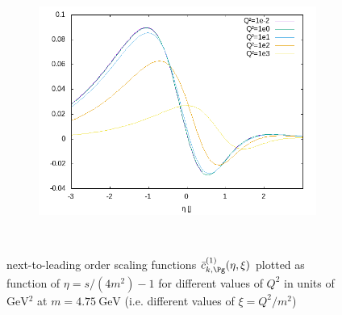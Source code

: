 \begin{figure}[ht!]
\begin{subfigure}[t]{.3\textwidth}
\end{subfigure}%
\begin{subfigure}[t]{.3\textwidth}
	\includegraphics[width=\textwidth]{../../img2/partonic/cgBar1_AA_x2g1}
\end{subfigure}\\%
\caption{next-to-leading order scaling functions $\bar c_{k,\Pg}^{(1)}(\eta,\xi)$ plotted as function of $\eta=s/(4m^2)-1$ for different values of $Q^2$ in units of $\si{\GeV^2}$ at $m=\SI{4.75}{\GeV}$ (i.e. different values of $\xi=Q^2/m^2$) }\label{fig:cg0}
\end{figure}

